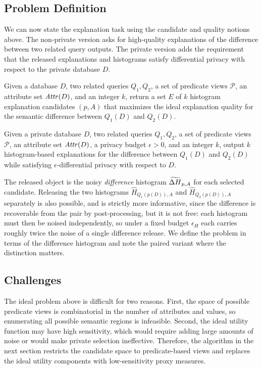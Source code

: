 \subsection{Problem Definition}
\label{subsec:problem-definition}

We can now state the explanation task using the candidate and quality notions above.
The non-private version asks for high-quality explanations of the difference between two related query outputs.
The private version adds the requirement that the released explanations and histograms satisfy differential privacy with respect to the private database $D$.

\begin{definition}
\label{def:query-difference-explanation}
Given a database $D$, two related queries $Q_1,Q_2$, a set of predicate views $\mathcal{P}$, an attribute set $\mathit{Attr}(D)$, and an integer $k$, return a set $E$ of $k$ histogram explanation candidates $(p,A)$ that maximizes the ideal explanation quality for the semantic difference between $Q_1(D)$ and $Q_2(D)$.
\end{definition}

\begin{definition}
\label{def:problem}
Given a private database $D$, two related queries $Q_1,Q_2$, a set of predicate views $\mathcal{P}$, an attribute set $\mathit{Attr}(D)$, a privacy budget $\epsilon>0$, and an integer $k$, output $k$ histogram-based explanations for the difference between $Q_1(D)$ and $Q_2(D)$ while satisfying $\epsilon$-differential privacy with respect to $D$.
\end{definition}

The released object is the noisy \emph{difference} histogram $\widetilde{\Delta H}_{p,A}$ for each selected candidate.
Releasing the two histograms $\hat H_{Q_1(p(D)),A}$ and $\hat H_{Q_2(p(D)),A}$ separately is also possible, and is strictly more informative, since the difference is recoverable from the pair by post-processing, but it is not free: each histogram must then be noised independently, so under a fixed budget $\epsilon_H$ each carries roughly twice the noise of a single difference release.
We define the problem in terms of the difference histogram and note the paired variant where the distinction matters.

\subsection{Challenges}
\label{subsec:model-challenges}

The ideal problem above is difficult for two reasons.
First, the space of possible predicate views is combinatorial in the number of attributes and values, so enumerating all possible semantic regions is infeasible.
Second, the ideal utility function may have high sensitivity, which would require adding large amounts of noise or would make private selection ineffective.
Therefore, the algorithm in the next section restricts the candidate space to predicate-based views and replaces the ideal utility components with low-sensitivity proxy measures.
